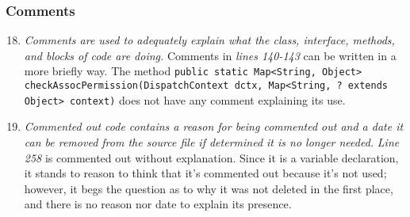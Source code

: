 	\subsubsection{Comments}
		\begin{enumerate}
			\setcounter{enumi}{17}
			\item \textit{Comments are used to adequately explain what the class, interface, methods, and blocks of code are doing.}
			Comments in \textit{lines 140-143} can be written in a more briefly way. 
			The method \texttt{public static Map<String, Object> checkAssocPermission(DispatchContext dctx, Map<String, ? extends Object> context)} does not have any comment explaining its use. 

			\item \textit{Commented out code contains a reason for being commented out and a date it can be removed from the source file if determined it is no longer needed.}\newline
			\textit{Line 258} is commented out without explanation. Since it is a variable declaration, it stands to reason to think that it's commented out because it's not used; however, it begs the question as to why it was not deleted in the first place, and there is no reason nor date to explain its presence.

		\end{enumerate}

